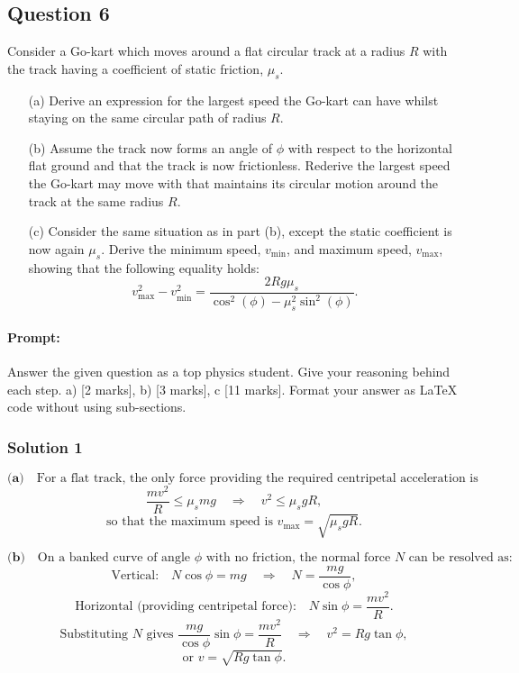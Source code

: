 \documentclass{article}
\begin{document}
\subsection{Question 6}

Consider a Go-kart which moves around a flat circular track at a radius $R$ with the track having a coefficient of static friction, $\mu_s$.

\begin{enumerate}
    \item[(a)] Derive an expression for the largest speed the Go-kart can have whilst staying on the same circular path of radius $R$.
    
    \item[(b)] Assume the track now forms an angle of $\phi$ with respect to the horizontal flat ground and that the track is now frictionless. Rederive the largest speed the Go-kart may move with that maintains its circular motion around the track at the same radius $R$.
    
    \item[(c)] Consider the same situation as in part (b), except the static coefficient is now again $\mu_s$. Derive the minimum speed, $v_{\text{min}}$, and maximum speed, $v_{\text{max}}$, showing that the following equality holds:
    \[
    v^2_{\text{max}} - v^2_{\text{min}} = \frac{2R g \mu_s}{\cos^2(\phi) - \mu_s^2 \sin^2(\phi)}.
    \]
\end{enumerate}

\paragraph{Prompt: \\} 
Answer the given question as a top physics student. Give your reasoning behind each step. a) [2 marks], b) [3 marks], c [11 marks].
Format your answer as LaTeX code without using sub-sections.

\subsubsection{Solution 1}
\[
\textbf{(a)}\quad \text{For a flat track, the only force providing the required centripetal acceleration is friction. Thus,}
\]
\[
\frac{mv^2}{R} \le \mu_s mg \quad\Longrightarrow\quad v^2 \le \mu_s g R,
\]
\[
\text{so that the maximum speed is } v_{\text{max}} = \sqrt{\mu_s g R}.
\]

\[
\textbf{(b)}\quad \text{On a banked curve of angle } \phi \text{ with no friction, the normal force } N \text{ can be resolved as:}
\]
\[
\text{Vertical:} \quad N\cos\phi = mg \quad\Longrightarrow\quad N = \frac{mg}{\cos\phi},
\]
\[
\text{Horizontal (providing centripetal force):} \quad N\sin\phi = \frac{mv^2}{R}.
\]
\[
\text{Substituting } N \text{ gives } \frac{mg}{\cos\phi}\sin\phi = \frac{mv^2}{R} \quad\Longrightarrow\quad v^2 = Rg\tan\phi,
\]
\[
\text{or } v = \sqrt{Rg\tan\phi}.
\]
\end{document}
